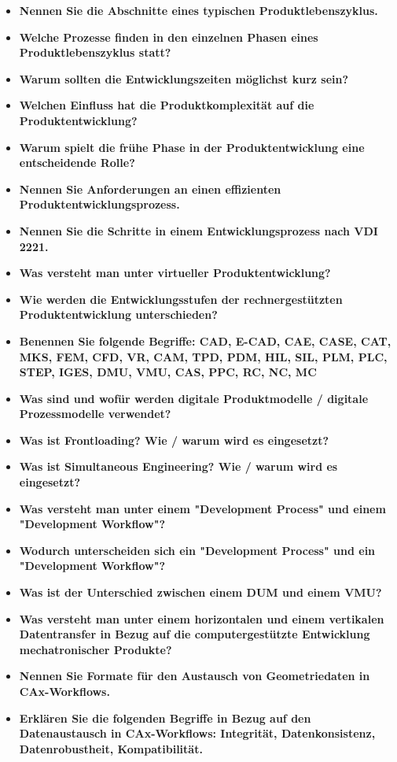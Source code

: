 \documentclass[10pt,a4paper,fleqn]{article}
\begin{document}
\setlength{\mathindent}{2cm}%
\begin{itemize}
	\item \textbf{Nennen Sie die Abschnitte eines typischen Produktlebenszyklus.}
	\item \textbf{Welche Prozesse finden in den einzelnen Phasen eines Produktlebenszyklus statt?}
	\item \textbf{Warum sollten die Entwicklungszeiten möglichst kurz sein?}
	\item \textbf{Welchen Einfluss hat die Produktkomplexität auf die Produktentwicklung?}
	\item \textbf{Warum spielt die frühe Phase in der Produktentwicklung eine entscheidende Rolle?}
	\item \textbf{Nennen Sie Anforderungen an einen effizienten Produktentwicklungsprozess.}
	\item \textbf{Nennen Sie die Schritte in einem Entwicklungsprozess nach VDI 2221.}
	\item \textbf{Was versteht man unter virtueller Produktentwicklung?}
	\item \textbf{Wie werden die Entwicklungsstufen der rechnergestützten Produktentwicklung unterschieden?}
	\item \textbf{Benennen Sie folgende Begriffe: CAD, E-CAD, CAE, CASE, CAT, MKS, FEM, CFD, VR, CAM, TPD, PDM, HIL, SIL, PLM, PLC, STEP, IGES, DMU, VMU, CAS, PPC, RC, NC, MC}
	\item \textbf{Was sind und wofür werden digitale Produktmodelle / digitale Prozessmodelle verwendet?}
	\item \textbf{Was ist Frontloading? Wie / warum wird es eingesetzt?}
	\item \textbf{Was ist Simultaneous Engineering? Wie / warum wird es eingesetzt?}
	\item \textbf{Was versteht man unter einem "Development Process" und einem "Development Workflow"?}
	\item \textbf{Wodurch unterscheiden sich ein "Development Process" und ein "Development Workflow"?}
	\item \textbf{Was ist der Unterschied zwischen einem DUM und einem VMU?}
	\item \textbf{Was versteht man unter einem horizontalen und einem vertikalen Datentransfer in Bezug auf die computergestützte Entwicklung mechatronischer Produkte?}
	\item \textbf{Nennen Sie Formate für den Austausch von Geometriedaten in CAx-Workflows.}
	\item \textbf{Erklären Sie die folgenden Begriffe in Bezug auf den Datenaustausch in CAx-Workflows: Integrität, Datenkonsistenz, Datenrobustheit, Kompatibilität.}

\end{itemize}
\end{document}

